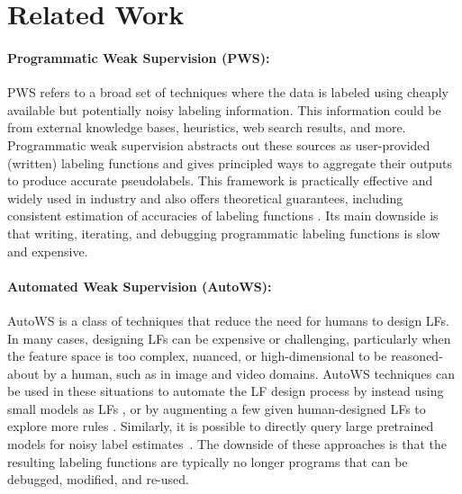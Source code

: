 \section{Related Work}

\paragraph{Programmatic Weak Supervision (PWS):} 
PWS refers to a broad set of techniques where the data is labeled using cheaply available but potentially noisy labeling information. This information could be from external knowledge bases, heuristics, web search results, and more. Programmatic weak supervision \cite{ratner2016data, ratner2017snorkel} abstracts out these sources as user-provided (written) labeling functions and gives principled ways to aggregate their outputs to produce accurate pseudolabels.
%
This framework is practically effective and widely used in industry \cite{ratner2017snorkel,bach2019snorkel} and also offers theoretical guarantees, including consistent estimation of accuracies of labeling functions \cite{ratner2016data, vishwakarma2022Lifting}.
%
Its main downside is that writing, iterating, and debugging programmatic labeling functions is slow and expensive. 

\paragraph{Automated Weak Supervision (AutoWS):} AutoWS is a class of  techniques that reduce the need for humans to design LFs. 
In many cases, designing LFs can be expensive or challenging, particularly when the feature space is too complex, nuanced, or high-dimensional to be reasoned-about by a human, such as in image and video domains. AutoWS techniques can be used in these situations to automate the LF design process by instead using small models as LFs \cite{varma2018snuba, das2020goggles, boecking2021interactive}, or by augmenting a few given human-designed LFs to explore more rules \cite{inproceedings}. Similarly, it is possible to directly query large pretrained models for noisy label estimates~\cite{smith2022language}. The downside of these approaches is that the resulting labeling functions are typically no longer programs that can be debugged, modified, and re-used. 

